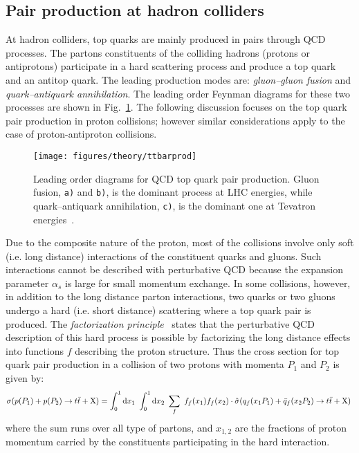 \subsection{Pair production at hadron colliders}
\label{sec:topprod}

At hadron colliders, top quarks are mainly produced in pairs through QCD
processes. The partons constituents of the
colliding hadrons (protons or antiprotons) participate in a hard
scattering process and produce a top quark and an antitop quark. The
leading production modes are: {\it gluon--gluon fusion} and {\it
  quark--antiquark annihilation}. The leading order Feynman diagrams
for these two processes are shown in Fig.~\ref{fig:ttbarprod}. The
following discussion focuses on the top quark pair production in proton
collisions; however similar considerations apply to the case of
proton-antiproton collisions.

\begin{figure}[!htb]\centering
  \texttt{[image: figures/theory/ttbarprod]}
  \caption{Leading order diagrams for QCD top quark pair production.
    Gluon fusion, {\tt a)} and {\tt b)}, is the dominant process at
    LHC energies, while quark--antiquark annihilation, {\tt c)}, is
    the dominant one at Tevatron energies~\cite{Fiorini:2012fe}.} 
  \label{fig:ttbarprod}
\end{figure}

Due to the composite nature of the proton, most of the
collisions involve only soft (i.e. long distance) interactions of the
constituent quarks and gluons. Such interactions cannot be described
with perturbative QCD because the expansion parameter $\alpha_s$ is
large for small momentum exchange.
In some collisions, however, in addition to the long distance parton
interactions, two quarks or two gluons undergo a hard (i.e. short
distance) scattering where a top quark pair is produced. 
The {\it factorization principle}~\cite{factorprinciple} states that
the perturbative QCD description of this hard process is possible by
factorizing the long distance effects into functions $f$ describing the
proton structure. Thus the cross section for top quark pair
production in a collision of two protons with momenta $P_1$ and $P_2$
is given by: 
\begin{equation}
  \sigma(p(P_1)+p(P_2)\to\mbox{$t\bar{t}$}{}+{\rm X})
  = 
  \int_0^1{\rm d}x_1
  ~\int_0^1{\rm d}x_2
  ~\sum_f~ f_f(x_1) f_f(x_2)
  \cdot{}\hat{\sigma}(q_f(x_1P_1)+\bar{q}_f(x_2P_2)\to\mbox{$t\bar{t}$}{}+{\rm
    X})
  \phantom{,}
  \label{eq:ttbarxs}
\end{equation}
where the sum runs over all type of partons, and $x_{1,2}$ are the
fractions of proton momentum carried by the constituents participating
in the hard interaction. 

